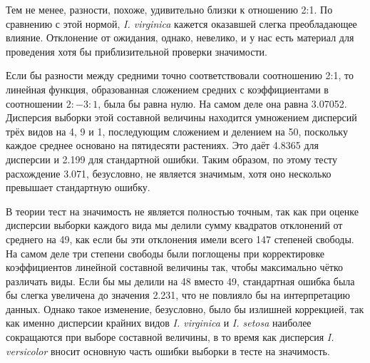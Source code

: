 \documentclass[12pt]{article}
\begin{document}
Тем не менее, разности, похоже, удивительно близки к отношению 2:1. По сравнению с этой нормой, \textit{I. virginica} кажется оказавшей слегка преобладающее влияние. Отклонение от ожидания, однако, невелико, и у нас есть материал для проведения хотя бы приблизительной проверки значимости.

Если бы разности между средними точно соответствовали соотношению 2:1, то линейная функция, образованная сложением средних с коэффициентами в соотношении $2:-3:1$, была бы равна нулю. На самом деле она равна 3.07052. Дисперсия выборки этой составной величины находится умножением дисперсий трёх видов на 4, 9 и 1, последующим сложением и делением на 50, поскольку каждое среднее основано на пятидесяти растениях. Это даёт 4.8365 для дисперсии и 2.199 для стандартной ошибки. Таким образом, по этому тесту расхождение 3.071, безусловно, не является значимым, хотя оно несколько превышает стандартную ошибку.

В теории тест на значимость не является полностью точным, так как при оценке дисперсии выборки каждого вида мы делили сумму квадратов отклонений от среднего на 49, как если бы эти отклонения имели всего 147 степеней свободы. На самом деле три степени свободы были поглощены при корректировке коэффициентов линейной составной величины так, чтобы максимально чётко различать виды. Если бы мы делили на 48 вместо 49, стандартная ошибка была бы слегка увеличена до значения 2.231, что не повлияло бы на интерпретацию данных. Однако такое изменение, безусловно, было бы излишней коррекцией, так как именно дисперсии крайних видов \textit{I. virginica} и \textit{I. setosa} наиболее сокращаются при выборе составной величины, в то время как дисперсия \textit{I. versicolor} вносит основную часть ошибки выборки в тесте на значимость.
\end{document}
